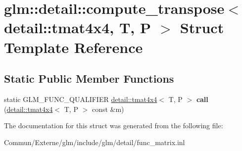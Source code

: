 \hypertarget{structglm_1_1detail_1_1compute__transpose_3_01detail_1_1tmat4x4_00_01_t_00_01_p_01_4}{}\section{glm\+:\+:detail\+:\+:compute\+\_\+transpose$<$ detail\+:\+:tmat4x4, T, P $>$ Struct Template Reference}
\label{structglm_1_1detail_1_1compute__transpose_3_01detail_1_1tmat4x4_00_01_t_00_01_p_01_4}
\subsection*{Static Public Member Functions}
\begin{DoxyCompactItemize}
\item 
static G\+L\+M\+\_\+\+F\+U\+N\+C\+\_\+\+Q\+U\+A\+L\+I\+F\+I\+ER \hyperlink{structglm_1_1detail_1_1tmat4x4}{detail\+::tmat4x4}$<$ T, P $>$ {\bfseries call} (\hyperlink{structglm_1_1detail_1_1tmat4x4}{detail\+::tmat4x4}$<$ T, P $>$ const \&m)\hypertarget{structglm_1_1detail_1_1compute__transpose_3_01detail_1_1tmat4x4_00_01_t_00_01_p_01_4_af9f856179336704a2eab5c72c6ef79e4}{}\label{structglm_1_1detail_1_1compute__transpose_3_01detail_1_1tmat4x4_00_01_t_00_01_p_01_4_af9f856179336704a2eab5c72c6ef79e4}

\end{DoxyCompactItemize}


The documentation for this struct was generated from the following file\+:\begin{DoxyCompactItemize}
\item 
Commun/\+Externe/glm/include/glm/detail/func\+\_\+matrix.\+inl\end{DoxyCompactItemize}
